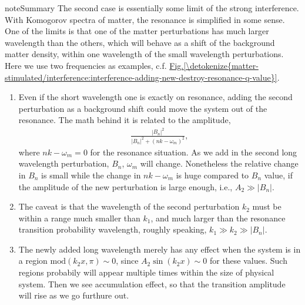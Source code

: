 \documentclass[letterpaper,12pt,english]{sphinxmanual}
\begin{document}
\begin{sphinxadmonition}{note}{Summary}
The second case is essentially some limit of the strong interference. With Komogorov spectra of matter, the resonance is simplified in some sense. One of the limits is that one of the matter perturbations has much larger wavelength than the others, which will behave as a shift of the background matter density, within one wavelength of the small wavelength perturbations. Here we use two frequencies as examples, c.f. \hyperref[\detokenize{matter-stimulated/interference:interference-adding-new-destroy-resonance-q-value}]{Fig.\@ \ref{\detokenize{matter-stimulated/interference:interference-adding-new-destroy-resonance-q-value}}}.
\begin{enumerate}
\item {} 
Even if the short wavelength one is exactly on resonance, adding the second perturbation as a background shift could move the system out of the resonance. The math behind it is related to the amplitude,
\begin{equation*}
\begin{split}\frac{ \left\lvert  B_{n}  \right\rvert^2 }{ \left\lvert    B_{n}  \right\rvert^2 + ( n  k - \omega_m )^2  },\end{split}
\end{equation*}
where \(n  k - \omega_m = 0\) for the resonance situation. As we add in the second long wavelength perturbation, \(B_{n}\), \(\omega_m\) will change. Nonetheless the relative change in \(B_n\) is small while the change in \(nk-\omega_m\) is huge compared to \(B_n\) value, if the amplitude of the new perturbation is large enough, i.e., \(A_2 \gg \lvert B_n\rvert\).

\item {} 
The caveat is that the wavelength of the second perturbation \(k_2\) must be within a range much smaller than \(k_1\), and much larger than the resonance transition probability wavelength, roughly speaking, \(k_1\gg k_2 \gg \lvert B_n\rvert\).

\item {} 
The newly added long wavelength merely has any effect when the system is in a region \(\mathrm{mod}(k_2 x,\pi)\sim 0\), since \(A_2\sin(k_2x)\sim 0\) for these values. Such regions probabily will appear multiple times within the size of physical system. Then we see accumulation effect, so that the transition amplitude will rise as we go furthure out.

\end{enumerate}

\end{sphinxadmonition}
\end{document}
